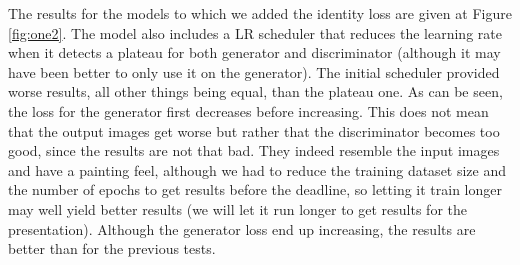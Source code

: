 \documentclass[twocolumn,superscriptaddress,aps,floatfix, nofootinbib]{revtex4-1}
\begin{document}
    The results for the models to which we added the identity loss are given at Figure \ref{fig:one2}. The model also includes a LR scheduler that reduces the learning rate when it detects a plateau for both generator and discriminator (although it may have been better to only use it on the generator). The initial scheduler provided worse results, all other things being equal, than the plateau one. As can be seen, the loss for the generator first decreases before increasing. This does not mean that the output images get worse but rather that the discriminator becomes too good, since the results are not that bad. They indeed resemble the input images and have a painting feel, although we had to reduce the training dataset size and the number of epochs to get results before the deadline, so letting it train longer may well yield better results (we will let it run longer to get results for the presentation). Although the generator loss end up increasing, the results are better than for the previous tests.
    
\end{document}
